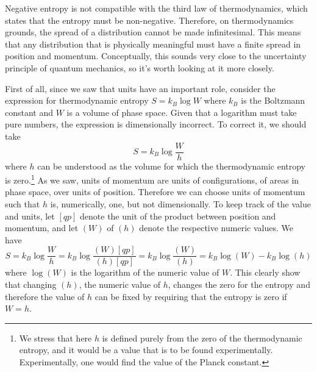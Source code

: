 Negative entropy is not compatible with the third law of thermodynamics, which states that the entropy must be non-negative. Therefore, on thermodynamics grounds, the spread of a distribution cannot be made infinitesimal. This means that any distribution that is physically meaningful must have a finite spread in position and momentum. Conceptually, this sounds very close to the uncertainty principle of quantum mechanics, so it's worth looking at it more closely.

First of all, since we saw that units have an important role, consider the expression for thermodynamic entropy $S=k_B \log W$ where $k_B$ is the Boltzmann constant and $W$ is a volume of phase space. Given that a logarithm must take pure numbers, the expression is dimensionally incorrect. To correct it, we should take
\begin{equation}
	S = k_B \log \frac{W}{h}
\end{equation}
where $h$ can be understood as the volume for which the thermodynamic entropy is zero.\footnote{We stress that here $h$ is defined purely from the zero of the thermodynamic entropy, and it would be a value that is to be found experimentally. Experimentally, one would find the value of the Planck constant.} As we saw, units of momentum are units of configurations, of areas in phase space, over units of position. Therefore we can choose units of momentum such that $h$ is, numerically, one, but not dimensionally. To keep track of the value and units, let $[qp]$ denote the unit of the product between position and momentum, and let $(W)$  of $(h)$ denote the respective numeric values. We have
\begin{equation}
	S = k_B \log \frac{W}{h} = k_B \log \frac{(W)[qp]}{(h) [qp]} = k_B \log \frac{(W)}{(h)} = k_B \log (W) - k_B \log (h)
\end{equation}
where $\log (W)$ is the logarithm of the numeric value of $W$. This clearly show that changing $(h)$, the numeric value of $h$, changes the zero for the entropy and therefore the value of $h$ can be fixed by requiring that the entropy is zero if $W=h$.

